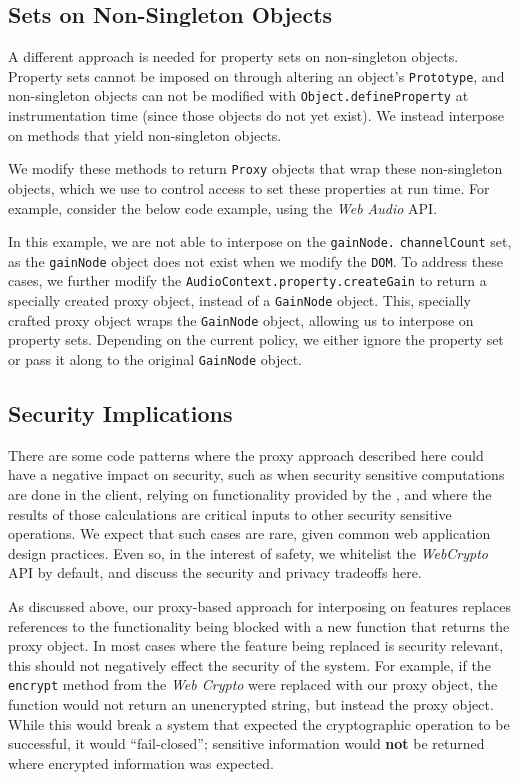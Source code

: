 \subsection{Sets on Non-Singleton Objects}
\label{cost-benefit:intercepting-js:proxy-non-signletons}
A different approach is needed for property sets on non-singleton objects.
Property sets cannot be imposed on through
altering an object's \texttt{Prototype}, and non-singleton objects
can not be modified with \texttt{Object.defineProperty} at
instrumentation time (since those objects do not yet exist). We instead interpose
on methods that yield non-singleton objects.

We modify these methods to return
\texttt{Proxy} objects that wrap these non-singleton objects, which we use
to control access to set these properties at run time. For example,
consider the below code example, using the \emph{Web Audio} API.



In this example, we are not able to interpose on the \texttt{gainNode.} \texttt{channelCount}
set, as the \texttt{gainNode} object does not exist when we modify the
\texttt{DOM}.  To address these cases, we further modify the
\texttt{AudioContext.property.createGain} to return a specially created
proxy object, instead of a \texttt{GainNode} object.  This, specially crafted
proxy object wraps the \texttt{GainNode} object, allowing us to interpose
on property sets.  Depending on the current policy, we either ignore the
property set or pass it along to the original \texttt{GainNode} object.


\subsection{Security Implications}
\label{cost-benefit:intercepting-js:proxy-security}

There are some code patterns where the proxy approach described here could have
a negative impact on security, such as when security sensitive computations are
done in the client, relying on functionality provided by the \WA, and where the
results of those calculations are critical inputs to other security sensitive
operations.  We expect that such cases are rare, given common web application
design practices. Even so, in the interest of safety, we whitelist the
\emph{WebCrypto} API by default, and discuss the security
and privacy tradeoffs here.

As discussed above, our proxy-based approach for interposing on \WA features
replaces references to the functionality being blocked with a new function that
returns the proxy object.  In most cases where the feature being replaced is
security relevant, this should not negatively effect the security of the system.  For
example, if the \texttt{encrypt} method from the \emph{Web Crypto} were
replaced with our proxy object, the function would not return an unencrypted
string, but instead the proxy object.  While this would break a system that
expected the cryptographic operation to be successful, it would
``fail-closed''; sensitive information would \textbf{not} be returned where
encrypted information was expected.

